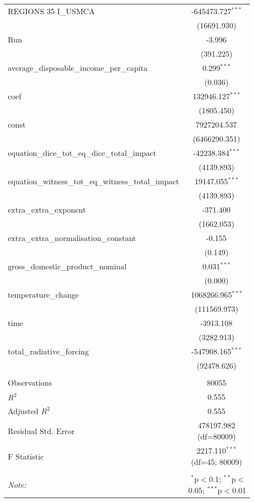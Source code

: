\begin{table}[!htbp]
\begin{tabular}{@{\extracolsep{5pt}}lc}
 REGIONS 35 I_USMCA & -645473.727$^{***}$ \\
& (16691.930) \\
 Run & -3.996$^{}$ \\
& (391.225) \\
 average_disposable_income_per_capita & 0.299$^{***}$ \\
& (0.036) \\
 coef & 132946.127$^{***}$ \\
& (1805.450) \\
 const & 7927204.537$^{}$ \\
& (6466290.351) \\
 equation_dice_tot_eq_dice_total_impact & -42238.384$^{***}$ \\
& (4139.893) \\
 equation_witness_tot_eq_witness_total_impact & 19147.055$^{***}$ \\
& (4139.893) \\
 extra_extra_exponent & -371.400$^{}$ \\
& (1662.053) \\
 extra_extra_normalisation_constant & -0.155$^{}$ \\
& (0.149) \\
 gross_domestic_product_nominal & 0.031$^{***}$ \\
& (0.000) \\
 temperature_change & 1068266.965$^{***}$ \\
& (111569.973) \\
 time & -3913.108$^{}$ \\
& (3282.913) \\
 total_radiative_forcing & -547908.165$^{***}$ \\
& (92478.626) \\
\hline \\[-1.8ex]
 Observations & 80055 \\
 $R^2$ & 0.555 \\
 Adjusted $R^2$ & 0.555 \\
 Residual Std. Error & 478197.982 (df=80009) \\
 F Statistic & 2217.110$^{***}$ (df=45; 80009) \\
\hline
\hline \\[-1.8ex]
\textit{Note:} & \multicolumn{1}{r}{$^{*}$p$<$0.1; $^{**}$p$<$0.05; $^{***}$p$<$0.01} \\
\end{tabular}
\end{table}